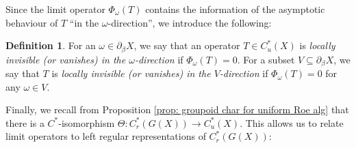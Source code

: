 \documentclass[12pt, a4paper]{amsart}
\numberwithin{equation}{section}
\newtheorem{cor}[thm]{Corollary}
\theoremstyle{definition}
\newtheorem{defn}[thm]{Definition}
\theoremstyle{remark}
\def\supp{\mathrm{supp}}
\begin{document}
%
%
%


Since the limit operator $\Phi_\omega(T)$ contains the information of the asymptotic behaviour of $T$ ``in the $\omega$-direction'', we introduce the following:

\begin{defn}\label{defn:vanish at infinity}
For an $\omega\in \partial_\beta X$, we say that an operator $T \in C^*_u(X)$ is \emph{locally invisible (\emph{or} vanishes) in the $\omega$-direction} if $\Phi_\omega(T)=0$. For a subset $V \subseteq \partial_\beta X$, we say that $T$ is \emph{locally invisible (\emph{or} vanishes) in the $V$-direction} if $\Phi_\omega(T)=0$ for any $\omega \in V$.
\end{defn}


Finally, we recall from Proposition \ref{prop: groupoid char for uniform Roe alg} that there is a $C^*$-isomorphism $\Theta: C^*_r(G(X)) \to C^*_u(X)$. This allows us to relate limit operators to left regular representations of $C^*_r(G(X))$:
\end{document}
